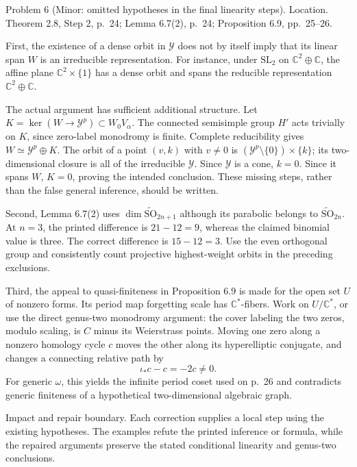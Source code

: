 \documentclass[10pt]{article}
\begin{document}
Problem 6 (Minor: omitted hypotheses in the final linearity steps).  Location. Theorem 2.8, Step 2, p. 24; Lemma 6.7(2), p. 24; Proposition 6.9, pp. 25–26.\par
First, the existence of a dense orbit in \(\mathcal Y\) does not by itself imply that its linear span \(W\) is an irreducible representation. For instance, under \(\mathrm{SL}_2\) on \(\mathbb C^2\oplus\mathbb C\), the affine plane \(\mathbb C^2\times\{1\}\) has a dense orbit and spans the reducible representation \(\mathbb C^2\oplus\mathbb C\).\par
The actual argument has sufficient additional structure. Let \(K=\ker(W\to\mathcal Y^p)\subset W_0V_\alpha\). The connected semisimple group \(H'\) acts trivially on \(K\), since zero-label monodromy is finite. Complete reducibility gives \(W\simeq\mathcal Y^p\oplus K\). The orbit of a point \((v,k)\) with \(v\ne0\) is \((\mathcal Y^p\setminus\{0\})\times\{k\}\); its two-dimensional closure is all of the irreducible \(\mathcal Y\). Since \(\mathcal Y\) is a cone, \(k=0\). Since it spans \(W\), \(K=0\), proving the intended conclusion. These missing steps, rather than the false general inference, should be written.\par
Second, Lemma 6.7(2) uses \(\dim\widetilde{\mathrm{SO}}_{2n+1}\) although its parabolic belongs to \(\widetilde{\mathrm{SO}}_{2n}\). At \(n=3\), the printed difference is \(21-12=9\), whereas the claimed binomial value is three. The correct difference is \(15-12=3\). Use the even orthogonal group and consistently count projective highest-weight orbits in the preceding exclusions.\par
Third, the appeal to quasi-finiteness in Proposition 6.9 is made for the open set \(U\) of nonzero forms. Its period map forgetting scale has \(\mathbb C^*\)-fibers. Work on \(U/\mathbb C^*\), or use the direct genus-two monodromy argument: the cover labeling the two zeros, modulo scaling, is \(C\) minus its Weierstrass points. Moving one zero along a nonzero homology cycle \(c\) moves the other along its hyperelliptic conjugate, and changes a connecting relative path by \[\iota_*c-c=-2c\ne0.\] For generic \(\omega\), this yields the infinite period coset used on p. 26 and contradicts generic finiteness of a hypothetical two-dimensional algebraic graph.\par
Impact and repair boundary. Each correction supplies a local step using the existing hypotheses. The examples refute the printed inference or formula, while the repaired arguments preserve the stated conditional linearity and genus-two conclusions.\par
\end{document}
